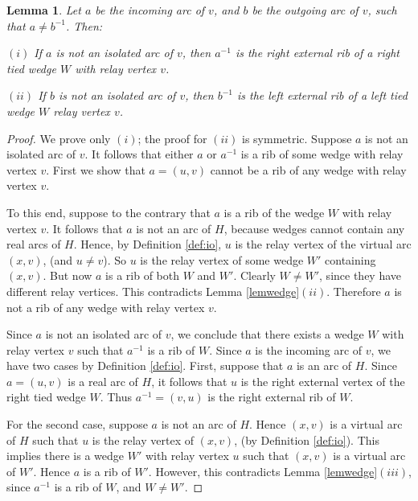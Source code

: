 \documentclass[12pt,letterpaper,oneside]{book}
\newtheorem{lemma}[theorem]{Lemma}
\begin{document}
\begin{lemma}\label{lemmaext} 
Let $a$ be the 
incoming arc of $v$, and $b$ be the outgoing arc of $v$, such that $a\ne b^{-1}$.  Then:
 
\noindent $(i)$ If $a$ is not an isolated arc of $v$, then $a^{-1}$ is the right external 
rib of a right tied wedge $W$ with relay vertex $v$.

\noindent $(ii)$ If $b$ is not an isolated arc of $v$, then $b^{-1}$ is the left external 
rib of a left tied wedge $W$ relay vertex $v$.   %
\end{lemma} 
\begin{proof} 

We prove only $(i)$; the proof for $(ii)$ is symmetric.  
Suppose $a$ is not an isolated arc of $v$.  It follows that either $a$ or $a^{-1}$ is a rib of some wedge with relay vertex $v$.  
First we show that $a=(u,v)$ cannot be a rib of any wedge with relay vertex $v$.  

To this end, suppose to the contrary that $a$ is 
a rib of the wedge $W$ with relay vertex $v$.  It follows that $a$ is not an arc of $H$, because 
wedges cannot contain any real arcs of $H$.  Hence, by Definition \ref{def:io}, $u$ 
is the relay vertex of the virtual arc $(x,v)$, (and $u\ne v$).  So $u$ is the relay vertex of some wedge $W'$ containing $(x,v)$.   
But now $a$ is a rib of both $W$ and $W'$.  Clearly $W\ne W'$, since 
they have different relay vertices.  This contradicts Lemma \ref{lemwedge}$(ii)$.  Therefore $a$ is not a rib of any wedge with 
relay vertex $v$.


Since $a$ is not an isolated arc of $v$, we conclude that there exists a wedge $W$ with relay vertex $v$ such that $a^{-1}$ is a rib of $W$.  
Since $a$ is the incoming arc of $v$, we have two cases by Definition \ref{def:io}.  
First, suppose that $a$ is an arc of $H$.  
Since $a=(u,v)$ is a real arc of $H$, it follows that $u$ is the right external vertex of the right tied wedge $W$.  
Thus $a^{-1}=(v,u)$ is 
the right external rib of $W$.  %

For the second case, suppose $a$ is not an arc of $H$.  Hence $(x,v)$ is a virtual arc 
of $H$ such that $u$ is the relay vertex of $(x,v)$, (by Definition \ref{def:io}).  This implies there is a wedge $W'$ with 
relay vertex $u$ such that $(x,v)$ is a virtual arc of $W'$.  Hence $a$ is a rib of $W'$.  However, this 
contradicts Lemma \ref{lemwedge}$(iii)$, since $a^{-1}$ is a rib of $W$, and $W\ne W'$.   

\end{proof} 
 
\end{document}
